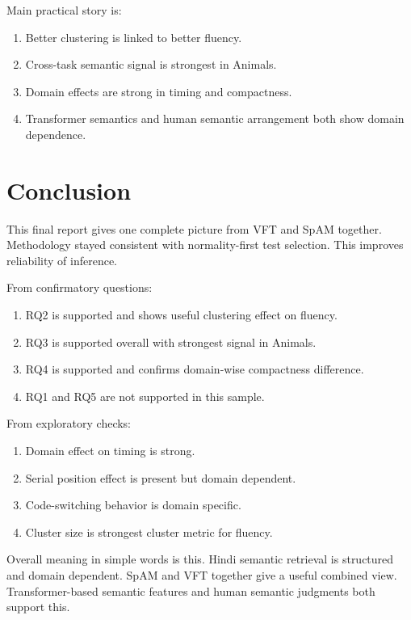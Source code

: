 Main practical story is:

\begin{enumerate}
\def\labelenumi{\arabic{enumi}.}
\tightlist
\item
  Better clustering is linked to better fluency.
\item
  Cross-task semantic signal is strongest in Animals.
\item
  Domain effects are strong in timing and compactness.
\item
  Transformer semantics and human semantic arrangement both show domain
  dependence.
\end{enumerate}

\section{Conclusion}\label{conclusion}

This final report gives one complete picture from VFT and SpAM together.
Methodology stayed consistent with normality-first test selection. This
improves reliability of inference.

From confirmatory questions:

\begin{enumerate}
\def\labelenumi{\arabic{enumi}.}
\tightlist
\item
  RQ2 is supported and shows useful clustering effect on fluency.
\item
  RQ3 is supported overall with strongest signal in Animals.
\item
  RQ4 is supported and confirms domain-wise compactness difference.
\item
  RQ1 and RQ5 are not supported in this sample.
\end{enumerate}

From exploratory checks:

\begin{enumerate}
\def\labelenumi{\arabic{enumi}.}
\tightlist
\item
  Domain effect on timing is strong.
\item
  Serial position effect is present but domain dependent.
\item
  Code-switching behavior is domain specific.
\item
  Cluster size is strongest cluster metric for fluency.
\end{enumerate}

Overall meaning in simple words is this. Hindi semantic retrieval is
structured and domain dependent. SpAM and VFT together give a useful
combined view. Transformer-based semantic features and human semantic
judgments both support this.

